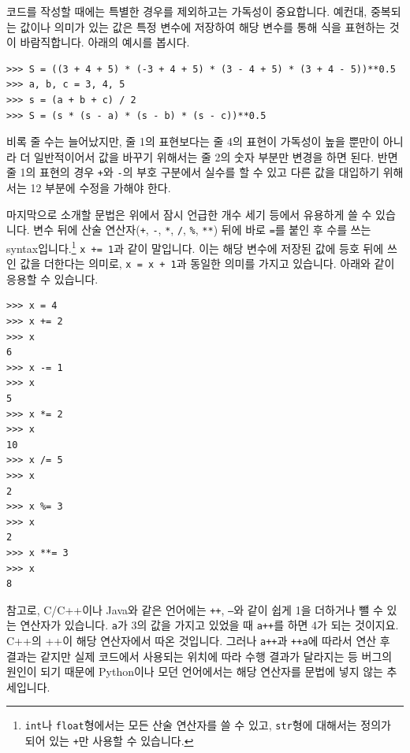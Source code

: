 \documentclass[../main.tex]{subfiles}
\begin{document}
코드를 작성할 때에는 특별한 경우를 제외하고는 가독성이 중요합니다.
예컨대, 중복되는 값이나 의미가 있는 값은 특정 변수에 저장하여 해당 변수를 통해 식을 표현하는 것이 바람직합니다.
아래의 예시를 봅시다.
\begin{verbatim}
>>> S = ((3 + 4 + 5) * (-3 + 4 + 5) * (3 - 4 + 5) * (3 + 4 - 5))**0.5
>>> a, b, c = 3, 4, 5
>>> s = (a + b + c) / 2
>>> S = (s * (s - a) * (s - b) * (s - c))**0.5
\end{verbatim}
비록 줄 수는 늘어났지만, 줄 1의 표현보다는 줄 4의 표현이 가독성이 높을 뿐만이 아니라 더 일반적이어서 값을 바꾸기 위해서는 줄 2의 숫자 부분만 변경을 하면 된다.
반면 줄 1의 표현의 경우 \texttt{+}와 \texttt{-}의 부호 구분에서 실수를 할 수 있고 다른 값을 대입하기 위해서는 12 부분에 수정을 가해야 한다.

마지막으로 소개할 문법은 위에서 잠시 언급한 개수 세기 등에서 유용하게 쓸 수 있습니다.
변수 뒤에 산술 연산자(\texttt{+}, \texttt{-}, \texttt{*}, \texttt{/}, \texttt{\%}, \texttt{**}) 뒤에 바로 \texttt{=}를 붙인 후 수를 쓰는 syntax입니다.\footnote{\texttt{int}나 \texttt{float}형에서는 모든 산술 연산자를 쓸 수 있고, \texttt{str}형에 대해서는 정의가 되어 있는 \texttt{+}만 사용할 수 있습니다.}
\texttt{x += 1}과 같이 말입니다.
이는 해당 변수에 저장된 값에 등호 뒤에 쓰인 값을 더한다는 의미로, \texttt{x = x + 1}과 동일한 의미를 가지고 있습니다.
아래와 같이 응용할 수 있습니다.
\begin{verbatim}
>>> x = 4
>>> x += 2
>>> x
6
>>> x -= 1
>>> x
5
>>> x *= 2
>>> x
10
>>> x /= 5
>>> x
2
>>> x %= 3
>>> x
2
>>> x **= 3
>>> x
8
\end{verbatim}
참고로, C/C++이나 Java와 같은 언어에는 \texttt{++}, \texttt{--}와 같이 쉽게 1을 더하거나 뺄 수 있는 연산자가 있습니다.
\texttt{a}가 3의 값을 가지고 있었을 때 \texttt{a++}를 하면 4가 되는 것이지요.
C++의 ++이 해당 연산자에서 따온 것입니다.
그러나 \texttt{a++}과 \texttt{++a}에 따라서 연산 후 결과는 같지만 실제 코드에서 사용되는 위치에 따라 수행 결과가 달라지는 등 버그의 원인이 되기 때문에 Python이나 모던 언어에서는 해당 연산자를 문법에 넣지 않는 추세입니다.
\end{document}
